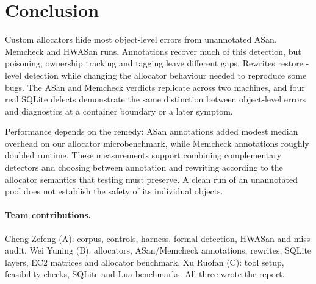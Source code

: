 \section{Conclusion}
\label{sec:conclusion}

Custom allocators hide most object-level errors from unannotated ASan, Memcheck and HWASan runs. Annotations recover much of this detection, but poisoning, ownership tracking and tagging leave different gaps. Rewrites restore -level detection while changing the allocator behaviour needed to reproduce some bugs. The ASan and Memcheck verdicts replicate across two machines, and four real SQLite defects demonstrate the same distinction between object-level errors and diagnostics at a container boundary or a later symptom.

Performance depends on the remedy: ASan annotations added modest median overhead on our allocator microbenchmark, while Memcheck annotations roughly doubled runtime. These measurements support combining complementary detectors and choosing between annotation and rewriting according to the allocator semantics that testing must preserve. A clean run of an unannotated pool does not establish the safety of its individual objects.

\paragraph{Team contributions.} Cheng Zefeng (A): corpus, controls, harness, formal detection, HWASan and miss audit. Wei Yuning (B): allocators, ASan/Memcheck annotations, rewrites, SQLite layers, EC2 matrices and allocator benchmark. Xu Ruofan (C): tool setup, feasibility checks, SQLite and Lua benchmarks. All three wrote the report.
